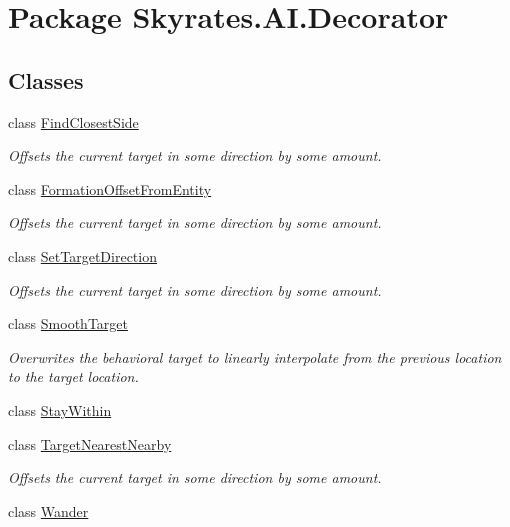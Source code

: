 \hypertarget{namespace_skyrates_1_1_a_i_1_1_decorator}{\section{Package Skyrates.\-A\-I.\-Decorator}
\label{namespace_skyrates_1_1_a_i_1_1_decorator}
}
\subsection*{Classes}
\begin{DoxyCompactItemize}
\item 
class \hyperlink{class_skyrates_1_1_a_i_1_1_decorator_1_1_find_closest_side}{Find\-Closest\-Side}
\begin{DoxyCompactList}\small\item\em Offsets the current target in some direction by some amount. \end{DoxyCompactList}\item 
class \hyperlink{class_skyrates_1_1_a_i_1_1_decorator_1_1_formation_offset_from_entity}{Formation\-Offset\-From\-Entity}
\begin{DoxyCompactList}\small\item\em Offsets the current target in some direction by some amount. \end{DoxyCompactList}\item 
class \hyperlink{class_skyrates_1_1_a_i_1_1_decorator_1_1_set_target_direction}{Set\-Target\-Direction}
\begin{DoxyCompactList}\small\item\em Offsets the current target in some direction by some amount. \end{DoxyCompactList}\item 
class \hyperlink{class_skyrates_1_1_a_i_1_1_decorator_1_1_smooth_target}{Smooth\-Target}
\begin{DoxyCompactList}\small\item\em Overwrites the behavioral target to linearly interpolate from the previous location to the target location. \end{DoxyCompactList}\item 
class \hyperlink{class_skyrates_1_1_a_i_1_1_decorator_1_1_stay_within}{Stay\-Within}
\item 
class \hyperlink{class_skyrates_1_1_a_i_1_1_decorator_1_1_target_nearest_nearby}{Target\-Nearest\-Nearby}
\begin{DoxyCompactList}\small\item\em Offsets the current target in some direction by some amount. \end{DoxyCompactList}\item 
class \hyperlink{class_skyrates_1_1_a_i_1_1_decorator_1_1_wander}{Wander}
\end{DoxyCompactItemize}
